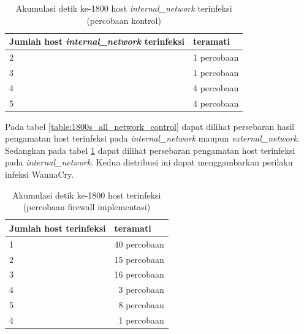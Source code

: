 \begin{table}[H]
	\caption{Akumulasi detik ke-1800 host \textit{internal\_network} terinfeksi (percobaan kontrol)}
	\label{table:1800s_internal_network_control}
	\begin{center}
		\begin{tabularx}{300px}{|X|r|}
			\hline
			\multicolumn{1}{|l}{\textbf{Jumlah host \textit{internal\_network} terinfeksi}} & \multicolumn{1}{|l|}{\textbf{teramati}} \\ \hline
			2 & 1 percobaan\\ \hline
			3 & 1 percobaan\\ \hline
			4 & 4 percobaan\\ \hline
			5 & 4 percobaan\\ \hline
		\end{tabularx}
	\end{center}
\end{table}

Pada tabel \ref{table:1800s_all_network_control} dapat dilihat persebaran hasil pengamatan host terinfeksi pada \textit{internal\_network} maupun \textit{external\_network}. Sedangkan pada tabel \ref{table:1800s_internal_network_control} dapat dilihat persebaran pengamatan host terinfeksi pada \textit{internal\_network}. Kedua distribusi ini dapat menggambarkan perilaku infeksi WannaCry.

\begin{table}[H]
	\caption{Akumulasi detik ke-1800 host terinfeksi (percobaan firewall implementasi)}
	\label{table:1800s_all_network_firewalled}
	\begin{center}
		\begin{tabularx}{300px}{|X|r|}
			\hline
			\multicolumn{1}{|l}{\textbf{Jumlah host terinfeksi}} & \multicolumn{1}{|l|}{\textbf{teramati}} \\ \hline
			1 & 40 percobaan\\ \hline
			2 & 15 percobaan\\ \hline
			3 & 16 percobaan\\ \hline
			4 & 3 percobaan\\ \hline
			5 & 8 percobaan\\ \hline
			4 & 1 percobaan\\ \hline
		\end{tabularx}
	\end{center}
\end{table}

